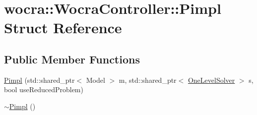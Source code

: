 \hypertarget{structwocra_1_1WocraController_1_1Pimpl}{}\section{wocra\+:\+:Wocra\+Controller\+:\+:Pimpl Struct Reference}
\label{structwocra_1_1WocraController_1_1Pimpl}
\subsection*{Public Member Functions}
\begin{DoxyCompactItemize}
\item 
\hyperlink{structwocra_1_1WocraController_1_1Pimpl_ae9e38baadd765c1005354808ea768800}{Pimpl} (std\+::shared\+\_\+ptr$<$ Model $>$ m, std\+::shared\+\_\+ptr$<$ \hyperlink{classocra_1_1OneLevelSolver}{One\+Level\+Solver} $>$ s, bool use\+Reduced\+Problem)
\item 
\hyperlink{structwocra_1_1WocraController_1_1Pimpl_a9e7ca6582122e345e4d51d30ed481450}{$\sim$\+Pimpl} ()
\end{DoxyCompactItemize}
